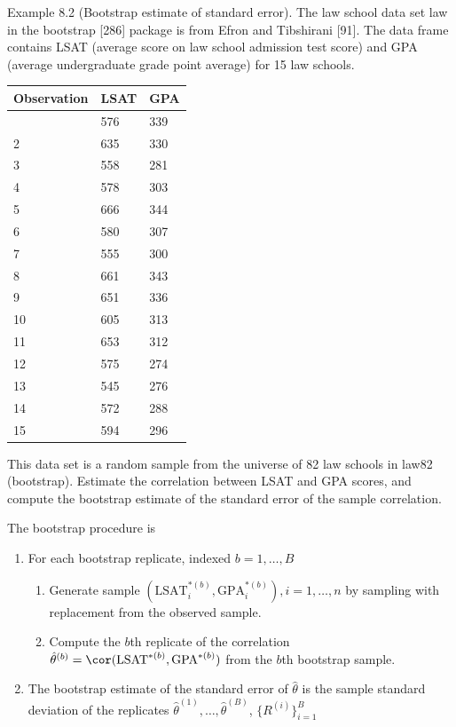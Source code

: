 \documentclass[
  letterpaper,
  DIV=11,
  numbers=noendperiod]{scrreprt}
\providecommand{\tightlist}{%
  \setlength{\itemsep}{0pt}\setlength{\parskip}{0pt}}
\begin{document}
Example 8.2 (Bootstrap estimate of standard error). The law school data
set law in the bootstrap {[}286{]} package is from Efron and Tibshirani
{[}91{]}. The data frame contains LSAT (average score on law school
admission test score) and GPA (average undergraduate grade point
average) for 15 law schools.

\begin{longtable}[]{@{}lll@{}}
\toprule\noalign{}
Observation & LSAT & GPA \\
\midrule\noalign{}
\endhead
\bottomrule\noalign{}
\endlastfoot
1 & 576 & 339 \\
2 & 635 & 330 \\
3 & 558 & 281 \\
4 & 578 & 303 \\
5 & 666 & 344 \\
6 & 580 & 307 \\
7 & 555 & 300 \\
8 & 661 & 343 \\
9 & 651 & 336 \\
10 & 605 & 313 \\
11 & 653 & 312 \\
12 & 575 & 274 \\
13 & 545 & 276 \\
14 & 572 & 288 \\
15 & 594 & 296 \\
\end{longtable}

This data set is a random sample from the universe of 82 law schools in
law82 (bootstrap). Estimate the correlation between LSAT and GPA scores,
and compute the bootstrap estimate of the standard error of the sample
correlation.

The bootstrap procedure is

\begin{enumerate}
\def\labelenumi{\arabic{enumi}.}
\tightlist
\item
  For each bootstrap replicate, indexed \(b = 1,\dots , B\)

  \begin{enumerate}
  \def\labelenumii{(\alph{enumii})}
  \tightlist
  \item
    Generate sample
    \((\text{LSAT}^{\ast (b)}_i, \text{GPA}^{\ast (b)}_i), i = 1,\dots , n\)
    by sampling with replacement from the observed sample.
  \item
    Compute the \(b\)th replicate of the correlation
    \(\hat \theta^{(b)} = \cor(\text{LSAT}^{\ast (b)}, \text{GPA}^{\ast (b)})\)
    from the \(b\)th bootstrap sample.
  \end{enumerate}
\item
  The bootstrap estimate of the standard error of \(\hat \theta\) is the
  sample standard deviation of the replicates
  \(\hat \theta^{(1)},\dots ,\hat \theta^{(B)}\),
  \(\{R^{(i)}\}_{i=1}^B\)
\end{enumerate}
\end{document}
